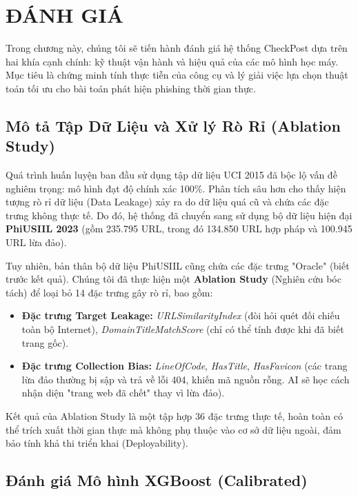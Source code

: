 
\chapter{ĐÁNH GIÁ }
\label{ch:danh-gia}

Trong chương này, chúng tôi sẽ tiến hành đánh giá hệ thống CheckPost dựa trên hai khía cạnh chính: kỹ thuật vận hành và hiệu quả của các mô hình học máy. Mục tiêu là chứng minh tính thực tiễn của công cụ và lý giải việc lựa chọn thuật toán tối ưu cho bài toán phát hiện phishing thời gian thực.

\section{Mô tả Tập Dữ Liệu và Xử lý Rò Rỉ (Ablation Study)}
\label{sec:dataset-ablation}

Quá trình huấn luyện ban đầu sử dụng tập dữ liệu UCI 2015 đã bộc lộ vấn đề nghiêm trọng: mô hình đạt độ chính xác 100\%. Phân tích sâu hơn cho thấy hiện tượng rò rỉ dữ liệu (Data Leakage) xảy ra do dữ liệu quá cũ và chứa các đặc trưng không thực tế. Do đó, hệ thống đã chuyển sang sử dụng bộ dữ liệu hiện đại \textbf{PhiUSIIL 2023} (gồm 235.795 URL, trong đó 134.850 URL hợp pháp và 100.945 URL lừa đảo).

Tuy nhiên, bản thân bộ dữ liệu PhiUSIIL cũng chứa các đặc trưng "Oracle" (biết trước kết quả). Chúng tôi đã thực hiện một \textbf{Ablation Study} (Nghiên cứu bóc tách) để loại bỏ 14 đặc trưng gây rò rỉ, bao gồm:
\begin{itemize}
    \item \textbf{Đặc trưng Target Leakage:} \textit{URLSimilarityIndex} (đòi hỏi quét đối chiếu toàn bộ Internet), \textit{DomainTitleMatchScore} (chỉ có thể tính được khi đã biết trang gốc).
    \item \textbf{Đặc trưng Collection Bias:} \textit{LineOfCode}, \textit{HasTitle}, \textit{HasFavicon} (các trang lừa đảo thường bị sập và trả về lỗi 404, khiến mã nguồn rỗng. AI sẽ học cách nhận diện "trang web đã chết" thay vì lừa đảo).
\end{itemize}

Kết quả của Ablation Study là một tập hợp 36 đặc trưng thực tế, hoàn toàn có thể trích xuất thời gian thực mà không phụ thuộc vào cơ sở dữ liệu ngoài, đảm bảo tính khả thi triển khai (Deployability).

\section{Đánh giá Mô hình XGBoost (Calibrated)}
\label{sec:danh-gia-mo-hinh}

